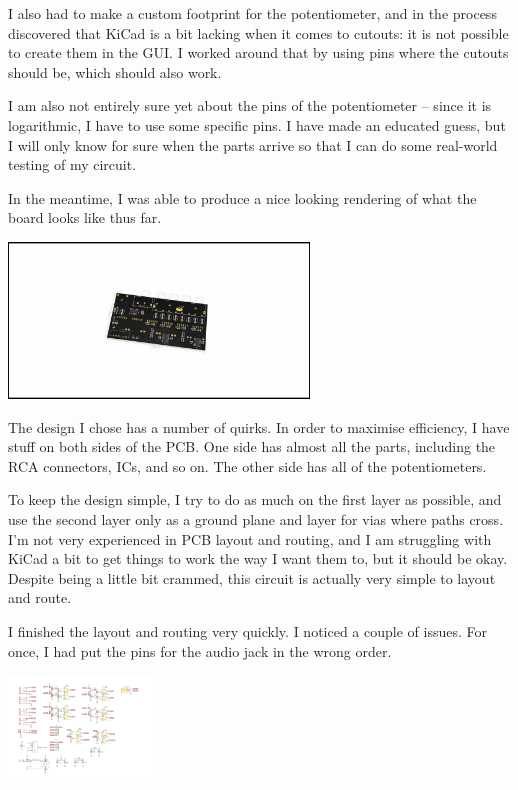 \documentclass[a4paper]{article}
\begin{document}
I also had to make a custom footprint for the potentiometer, and in the process discovered that KiCad is a bit lacking when it comes to cutouts: it is not possible to create them in the GUI. I worked around that by using pins where the cutouts should be, which should also work.

I am also not entirely sure yet about the pins of the potentiometer -- since it is logarithmic, I have to use some specific pins. I have made an educated guess, but I will only know for sure when the parts arrive so that I can do some real-world testing of my circuit.

In the meantime, I was able to produce a nice looking rendering of what the board looks like thus far.

\begin{center}
\includegraphics[width=8cm,trim={43cm 21cm 45cm 22cm},clip]{images/rendering-2019-11-09}
\end{center}

The design I chose has a number of quirks. In order to maximise efficiency, I have stuff on both sides of the PCB. One side has almost all the parts, including the RCA connectors, ICs, and so on. The other side has all of the potentiometers. 

To keep the design simple, I try to do as much on the first layer as possible, and use the second layer only as a ground plane and layer for vias where paths cross. I'm not very experienced in PCB layout and routing, and I am struggling with KiCad a bit to get things to work the way I want them to, but it should be okay. Despite being a little bit crammed, this circuit is actually very simple to layout and route.

I finished the layout and routing very quickly. I noticed a couple of issues. For once, I had put the pins for the audio jack in the wrong order.

\begin{center}
\includegraphics[width=4cm,trim={22cm 17cm 4cm 1.8cm},clip]{images/audio-mixer.pdf}
\end{center}
\end{document}

